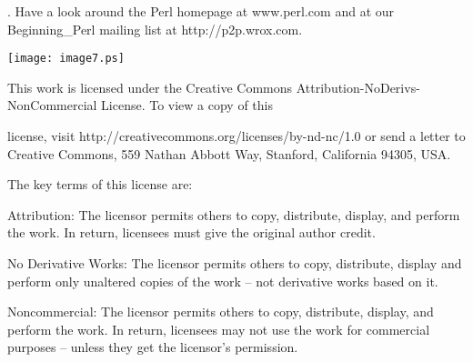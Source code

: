 \documentclass[a4paper,12pt,twoside]{book}
\begin{document}
\noindent 

.  Have a look around the Perl homepage at www.perl.com and at our Beginning\_Perl mailing list at http://p2p.wrox.com.

\noindent 

\noindent 

\noindent 

\noindent 

\noindent 

\noindent \texttt{[image: image7.ps]}

\noindent 

\noindent This work is licensed under the Creative Commons Attribution-NoDerivs-NonCommercial License. To view a copy of this

\noindent license, visit http://creativecommons.org/licenses/by-nd-nc/1.0 or send a letter to Creative Commons, 559 Nathan Abbott Way, Stanford, California 94305, USA.

\noindent 

\noindent The key terms of this license are:

\noindent 

\noindent Attribution: The licensor permits others to copy, distribute, display, and perform the work. In return, licensees must give the original author credit.

\noindent 

\noindent No Derivative Works: The licensor permits others to copy, distribute, display and perform only unaltered copies of the work -- not derivative works based on it.

\noindent 

\noindent Noncommercial: The licensor permits others to copy, distribute, display, and perform the work. In return, licensees may not use the work for commercial purposes -- unless they get the licensor's permission.
\end{document}
